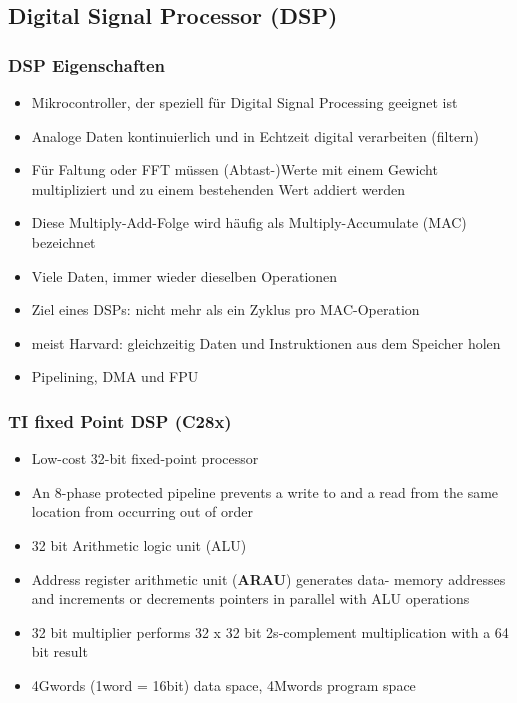 \subsection{Digital Signal Processor (DSP)}
\begin{multicols}{2}
\subsubsection{DSP Eigenschaften}
\begin{itemize}
    \item Mikrocontroller, der speziell für Digital Signal Processing geeignet ist
    \item Analoge Daten kontinuierlich und in Echtzeit digital verarbeiten (filtern)
    \item Für Faltung oder FFT müssen (Abtast-)Werte mit einem Gewicht multipliziert und zu einem bestehenden Wert addiert werden
    \item Diese Multiply-Add-Folge wird häufig als Multiply-Accumulate (MAC) bezeichnet
    \item Viele Daten, immer wieder dieselben Operationen
    \item Ziel eines DSPs: nicht mehr als ein Zyklus pro MAC-Operation
    \item meist Harvard: gleichzeitig Daten und Instruktionen aus dem Speicher holen
    \item Pipelining, DMA und FPU
\end{itemize}
\columnbreak
\subsubsection{TI fixed Point DSP (C28x)}
\begin{itemize}
    \item Low-cost 32-bit fixed-point processor
    \item An 8-phase protected pipeline prevents a write to and a read from the same
location from occurring out of order
    \item 32 bit Arithmetic logic unit (ALU)
    \item Address register arithmetic unit (\textbf{ARAU}) generates data- memory addresses
and increments or decrements pointers in parallel with ALU operations
    \item 32 bit multiplier performs 32 x 32 bit 2s-complement multiplication with a 64
bit result
    \item 4Gwords (1word = 16bit) data space, 4Mwords program space
\end{itemize}
\end{multicols}

